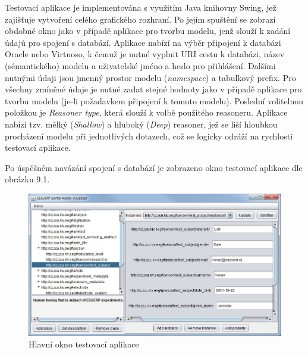 \documentclass{projekt}
\begin{document}
Testovací aplikace je implementována s využitím Java knihovny Swing, jež zajišťuje vytvoření celého grafického rozhraní. Po jejím spuštění se zobrazí obdobné okno jako v případě aplikace pro tvorbu modelu, jenž slouží k zadání údajů pro spojení s databází. Aplikace nabízí na výběr připojení k databázi Oracle nebo Virtuoso, k čemuž je nutné vyplnit URI cestu k databázi, název (sémantického) modelu a uživatelské jméno a heslo pro přihlášení. Dalšími nutnými údaji jsou jmenný prostor modelu ({\it namespace}) a tabulkový prefix. Pro všechny zmíněné údaje je nutné zadat stejné hodnoty jako v případě aplikace pro tvorbu modelu (je-li požadavkem připojení k tomuto modelu). Poslední volitelnou položkou je {\it Reasoner type}, která slouží k volbě použitého reasoneru. Aplikace nabízí tzv. mělký ({\it Shallow}) a hluboký ({\it Deep}) reasoner, jež se liší hloubkou procházení modelu při jednotlivých dotazech, což se logicky odráží na rychlosti testovací aplikace.

Po úspěšném navázání spojení s databází je zobrazeno okno testovací aplikace dle obrázku 9.1.


\begin{figure}[htb]
\begin{center}
\includegraphics[scale=0.60]{mainFrame.jpg}
\caption{Hlavní okno testovací aplikace}
\end{center}
\end{figure}
\end{document}
